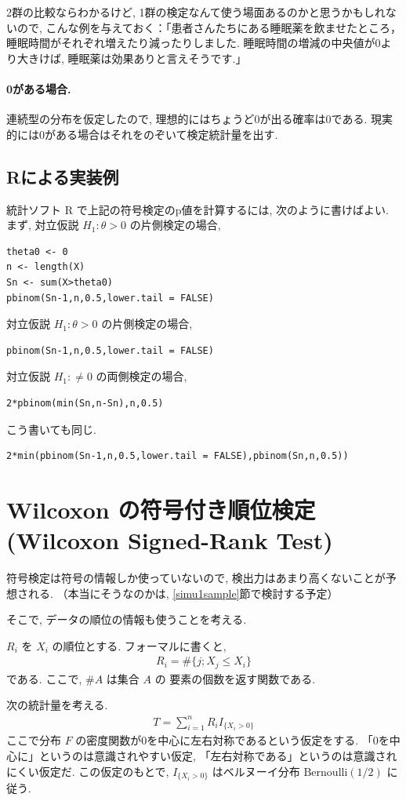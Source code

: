 \documentclass[12pt]{jsarticle}
\begin{document}
2群の比較ならわかるけど, 1群の検定なんて使う場面あるのかと思うかもしれないので, こんな例を与えておく：「患者さんたちにある睡眠薬を飲ませたところ，　睡眠時間がそれぞれ増えたり減ったりしました. 睡眠時間の増減の中央値が0より大きけば, 睡眠薬は効果ありと言えそうです.」

\paragraph{0がある場合.} 
連続型の分布を仮定したので, 理想的にはちょうど0が出る確率は0である.
現実的には0がある場合はそれをのぞいて検定統計量を出す.

\subsection{Rによる実装例}

統計ソフト R で上記の符号検定のp値を計算するには, 次のように書けばよい.
まず, 対立仮説 $H_1: \theta > 0$ の片側検定の場合,
\begin{verbatim}
theta0 <- 0
n <- length(X)
Sn <- sum(X>theta0)
pbinom(Sn-1,n,0.5,lower.tail = FALSE)
\end{verbatim}
対立仮説 $H_1: \theta > 0$ の片側検定の場合, 
\begin{verbatim}
pbinom(Sn-1,n,0.5,lower.tail = FALSE)
\end{verbatim}
対立仮説 $H_1: \neq  0$ の両側検定の場合, 
\begin{verbatim}
2*pbinom(min(Sn,n-Sn),n,0.5)
\end{verbatim}
こう書いても同じ.
\begin{verbatim}
2*min(pbinom(Sn-1,n,0.5,lower.tail = FALSE),pbinom(Sn,n,0.5))
\end{verbatim}

\section{Wilcoxon の符号付き順位検定(Wilcoxon Signed-Rank Test)}
符号検定は符号の情報しか使っていないので, 検出力はあまり高くないことが予想される. （本当にそうなのかは, \ref{simu1sample}節で検討する予定）

そこで, データの順位の情報も使うことを考える. 

$R_i$ を $X_i$ の順位とする.
フォーマルに書くと,
\begin{align}
R_i = \#\{j;X_j\le X_i\}
\end{align}
である. ここで, $\#A$ は集合 $A$ の 要素の個数を返す関数である.

次の統計量を考える.
\begin{align}
T = \sum_{i=1}^{n}R_i I_{\{X_i>0\}}
\end{align}
ここで分布 $F$ の密度関数が0を中心に左右対称であるという仮定をする. 「0を中心に」というのは意識されやすい仮定, 「左右対称である」というのは意識されにくい仮定だ.
この仮定のもとで, $ I_{\{X_i>0\}}$ はベルヌーイ分布 $\mathrm{Bernoulli}(1/2)$ に従う.
\end{document}
